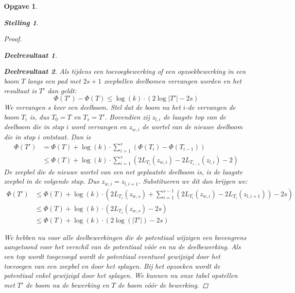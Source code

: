 \documentclass[12pt,hidelinks]{article}
\newtheorem{opgave}{Opgave}
\newtheorem{stelling}{Stelling}
\newtheorem{deelresultaat}{Deelresultaat}
\begin{document}
\begin{opgave}
\begin{description}
\begin{stelling}
\begin{proof}
\begin{deelresultaat}
                        \end{deelresultaat}
                        \begin{deelresultaat}
                        Als tijdens een toevoegbewerking of een opzoekbewerking in een boom $T$ langs een pad met $2s+1$ zeepbellen deelbomen vervangen worden en het resultaat is $T'$ dan geldt:
                        \normalfont
                        $$\Phi(T')-\Phi(T) \le \log(k)\cdot(2\log|T'| - 2s)$$
                        We vervangen $s$ keer een deelboom. 
                        Stel dat de boom na het $i$-de vervangen de boom $T_i$ is, dus $T_0=T$ en $T_s=T'$.
                        Bovendien zij $z_{l,i}$ de laagste top van de deelboom die in stap $i$ word vervangen en $z_{w,i}$ de wortel van de nieuwe deelboom die in stap $i$ ontstaat. Dan is
                        \begin{align*}
                            \Phi(T') &= \Phi(T) + \log(k)\cdot\sum_{i=1}^{s}{(\Phi(T_i)-\Phi(T_{i-1}))}\\                                
                            &\le \Phi(T) + \log(k)\cdot\sum_{i=1}^{s}{(2L_{T_i}(z_{w,i})-2L_{T_{i-1}}(z_{l,i})-2)}
                        \end{align*}
                        De zeepbel die de nieuwe wortel van een net geplaatste deelboom is,
                        is de laagste zeepbel in de volgende stap.
                        Dus $z_{w,i}=z_{l,i+1}$. Substitueren we dit dan krijgen we:
                        \begin{align*}
                            \Phi(T') &\le \Phi(T) + \log(k)\cdot(2L_{T_s}(z_{w,s})+\sum_{i=1}^{s-1}{(2L_{T_i}(z_{w,i})-2L_{T_i}(z_{l,i+1}))} - 2s)\\
                            &\le \Phi(T)+\log(k)\cdot (2L_{T_s}(z_{w,s}) - 2s )\\
                            &\le \Phi(T) + \log(k)\cdot( 2\log(|T'|)-2s)
                        \end{align*}
                        \end{deelresultaat}
                        We hebben nu voor alle deelbewerkingen die de potentiaal wijzigen een bovengrens aangetoond voor het verschil van de potentiaal vóór en na de deelbewerking.
                        Als een top wordt toegevoegd wordt de potentiaal eventueel gewijzigd door het toevoegen van een zeepbel en door het splayen.
                        Bij het opzoeken wordt de potentiaal enkel gewijzigd door het splayen.
                        We kunnen nu onze tabel opstellen met $T'$ de boom na de bewerking en $T$ de boom vóór de bewerking.

\end{proof}
\end{stelling}
\end{description}
\end{opgave}
\end{document}

